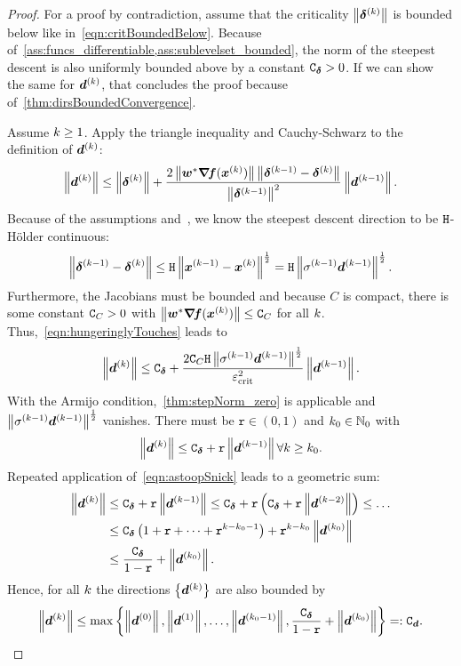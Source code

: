 \documentclass{article}
\theoremstyle{plain}
\theoremstyle{definition}
\begin{document}
\begin{proof}
For a proof by contradiction, assume that 
the criticality $\left\|\bm{\delta}^{(k)}\right\|$ is bounded below like in~\eqref{eqn:critBoundedBelow}.
Because of~\cref{ass:funcs_differentiable,ass:sublevelset_bounded},
the norm of the steepest descent is also uniformly bounded 
above by a constant $\mathtt C_{\bm{\delta}} > 0$.
If we can show the same for $\bm{d}^{(k)}$, that concludes the proof
because of~\cref{thm:dirsBoundedConvergence}.

Assume $k \geq 1$.
Apply the triangle inequality and Cauchy-Schwarz
to the definition of $\bm{d}^{(k)}$:
\begin{equation}
	\left\|\bm{d}^{(k)}\right\|
	\leq
	\left\|\bm{\delta}^{(k)}\right\|
	+ 
	\frac{
		2 
		\left\|\bm{w}^*\bm{\nabla}\!\bm{f}(\bm{x}^{(k)})\right\|
		\left\|\bm{\delta}^{(k-1)} - \bm{\delta}^{(k)}\right\|
	}{
		\left\|\bm{\delta}^{(k-1)}\right\|^2
	}
	\left\|\bm{d}^{(k-1)}\right\|.
	\label{eqn:hungeringlyTouches}
\end{equation}
Because of the assumptions and~\cite{svaiterMultiobjectiveSteepestDescent2018},
we know the steepest descent direction to be $\mathtt{H}$-Hölder
continuous:
$$
\left\|\bm{\delta}^{(k-1)} - \bm{\delta}^{(k)}\right\|
\leq
\mathtt{H}
\left\|\bm{x}^{(k-1)} - \bm{x}^{(k)}\right\|^\frac{1}{2}
=
\mathtt{H}
\left\|\sigma^{(k-1)}\bm{d}^{(k-1)}\right\|^\frac{1}{2}.
$$
Furthermore, the Jacobians must be bounded and because
$C$ is compact, there is some constant $\mathtt C_{C} > 0$
with $\left\|\bm{w}^*\bm{\nabla}\!\bm{f}(\bm{x}^{(k)})\right\| \leq \mathtt C_{C}$ for all $k$.
Thus,~\eqref{eqn:hungeringlyTouches} leads to
\begin{equation}
	\left\|\bm{d}^{(k)}\right\|
	\leq
	\mathtt C_{\bm{\delta}}
	+
	\frac{
		2\mathtt C_{C}
			\mathtt{H}\left\|\sigma^{(k-1)}\bm{d}^{(k-1)}\right\|^\frac{1}{2}
		}{
			\varepsilon_{\mathrm{crit}}^2
		}
	\left\|\bm{d}^{(k-1)}\right\|.
\end{equation}
With the Armijo condition,~\cref{thm:stepNorm_zero} is
applicable and $\left\|\sigma^{(k-1)} \bm{d}^{(k-1)}\right\|^\frac{1}{2}$
vanishes.
There must be $\mathtt{r}\in(0,1)$ and 
$k_0\in \mathbb N_0$ with 
\begin{equation}
	\left\|\bm{d}^{(k)}\right\|
	\leq
	\mathtt C_{\bm{\delta}}
	+ 
	\mathtt{r}
	\left\|\bm{d}^{(k-1)}\right\|
	\forall 
	k \geq k_0
	.
	\label{eqn:astoopSnick}
\end{equation}
Repeated application of~\eqref{eqn:astoopSnick}
leads to a geometric sum:
\begin{align*}
	\left\|\bm{d}^{(k)}\right\|
	&\leq
	\mathtt C_{\bm{\delta}}
	+ 
	\mathtt{r}
	\left\|\bm{d}^{(k-1)}\right\|
	\leq
	\mathtt C_{\bm{\delta}}
	+ 
	\mathtt{r}
	\left( 
		\mathtt C_{\bm{\delta}}
		+ 
		\mathtt{r}
		\left\|\bm{d}^{(k-2)}\right\|
	\right)
	\leq
	\dotso
	\\
	&\leq
	\mathtt C_{\bm{\delta}}
	\left(
	1 + \mathtt{r} + \dotsm + \mathtt{r}^{k - k_0 - 1}
	\right)
	+
	\mathtt{r}^{k-k_0}
	\left\|\bm{d}^{(k_0)}\right\|
	\\
	&\leq
	\frac{\mathtt C_{\bm{\delta}}}{1-\mathtt{r}}
	+
	\left\|\bm{d}^{(k_0)}\right\|
	.
\end{align*}
Hence, for all $k$ the directions $\left\{\bm{d}^{(k)}\right\}$ are also
bounded by
$$
\left\|\bm{d}^{(k)}\right\|
\leq
\max 
\left\{
	\left\|\bm{d}^{(0)}\right\|,
	\left\|\bm{d}^{(1)}\right\|,
	\ldots,
	\left\|\bm{d}^{(k_0-1)}\right\|,
	\frac{\mathtt C_{\bm{\delta}}}{1-\mathtt{r}}
	+
	\left\|\bm{d}^{(k_0)}\right\|
\right\} =: \mathtt C_{\bm{d}}.
$$
\end{proof}
\end{document}
